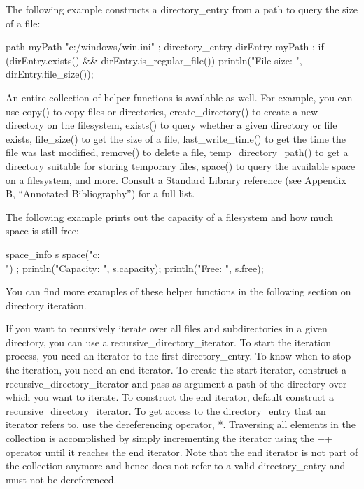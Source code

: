 The following example constructs a directory\_entry from a path to query the size of a file:

\begin{cpp}
path myPath { "c:/windows/win.ini" };
directory_entry dirEntry { myPath };
if (dirEntry.exists() && dirEntry.is_regular_file()) {
    println("File size: {}", dirEntry.file_size());
}
\end{cpp}


An entire collection of helper functions is available as well. For example, you can use copy() to copy files or directories, create\_directory() to create a new directory on the filesystem, exists() to query whether a given directory or file exists, file\_size() to get the size of a file, last\_write\_time() to get the time the file was last modified, remove() to delete a file, temp\_directory\_path() to get a directory suitable for storing temporary files, space() to query the available space on a filesystem, and more. Consult a Standard Library reference (see Appendix B, “Annotated Bibliography”) for a full list.

The following example prints out the capacity of a filesystem and how much space is still free:

\begin{cpp}
space_info s { space("c:\\") };
println("Capacity: {}", s.capacity);
println("Free: {}", s.free);
\end{cpp}

You can find more examples of these helper functions in the following section on directory iteration.



If you want to recursively iterate over all files and subdirectories in a given directory, you can use a recursive\_directory\_iterator. To start the iteration process, you need an iterator to the first directory\_entry. To know when to stop the iteration, you need an end iterator. To create the start iterator, construct a recursive\_directory\_iterator and pass as argument a path of the directory over which you want to iterate. To construct the end iterator, default construct a recursive\_directory\_iterator. To get access to the directory\_entry that an iterator refers to, use the dereferencing operator, *. Traversing all elements in the collection is accomplished by simply incrementing the iterator using the ++ operator until it reaches the end iterator. Note that the end iterator is not part of the collection anymore and hence does not refer to a valid directory\_entry and must not be dereferenced.

